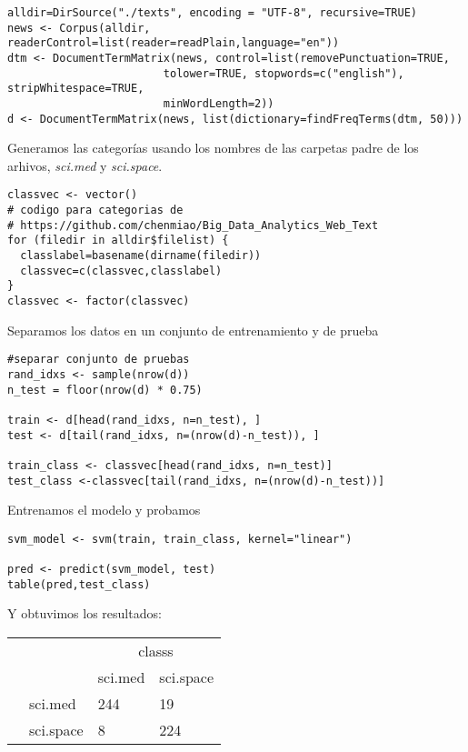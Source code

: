 \documentclass{article}
\begin{document}
\begin{enumerate}
\begin{lstlisting}
alldir=DirSource("./texts", encoding = "UTF-8", recursive=TRUE)
news <- Corpus(alldir, readerControl=list(reader=readPlain,language="en"))
dtm <- DocumentTermMatrix(news, control=list(removePunctuation=TRUE, 
                        tolower=TRUE, stopwords=c("english"), stripWhitespace=TRUE, 
                        minWordLength=2))
d <- DocumentTermMatrix(news, list(dictionary=findFreqTerms(dtm, 50)))
\end{lstlisting}
Generamos las categorías usando los nombres de las carpetas padre de los arhivos, \emph{sci.med} y \emph{sci.space}.
\begin{lstlisting}
classvec <- vector()
# codigo para categorias de 
# https://github.com/chenmiao/Big_Data_Analytics_Web_Text
for (filedir in alldir$filelist) {
  classlabel=basename(dirname(filedir))
  classvec=c(classvec,classlabel)
}
classvec <- factor(classvec)
\end{lstlisting}
Separamos los datos en un conjunto de entrenamiento y de prueba
\begin{lstlisting}
#separar conjunto de pruebas
rand_idxs <- sample(nrow(d))
n_test = floor(nrow(d) * 0.75)

train <- d[head(rand_idxs, n=n_test), ]
test <- d[tail(rand_idxs, n=(nrow(d)-n_test)), ]

train_class <- classvec[head(rand_idxs, n=n_test)]
test_class <-classvec[tail(rand_idxs, n=(nrow(d)-n_test))]
\end{lstlisting}
Entrenamos el modelo y probamos
\begin{lstlisting}
svm_model <- svm(train, train_class, kernel="linear")

pred <- predict(svm_model, test)
table(pred,test_class)

\end{lstlisting}

Y obtuvimos los resultados:

\begin{table}[H]
\centering
\label{my-label}
\begin{tabular}{|l|l|l|l|}
\hline
\multicolumn{2}{|l|}{\multirow{2}{*}{}} & \multicolumn{2}{c|}{classs} \\ \cline{3-4} 
\multicolumn{2}{|l|}{} & sci.med & sci.space \\ \hline
\multirow{1}{*}{ \parbox[t]{1mm}{} } & sci.med & 244 & 19 \\ \cline{2-4} 
 & sci.space & 8 & 224 \\ \hline
\end{tabular}
\end{table}


\end{enumerate}
\end{document}
